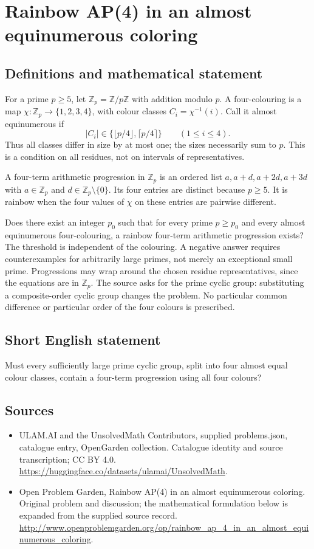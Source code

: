 \documentclass[11pt,a4paper]{article}
\begin{document}
\section*{Rainbow AP(4) in an almost equinumerous coloring}\label{statement}

\subsection{Definitions and mathematical statement}
For a prime $p\ge5$, let $\mathbb Z_p=\mathbb Z/p\mathbb Z$ with addition
modulo $p$. A four-colouring is a map $\chi:\mathbb Z_p\to\{1,2,3,4\}$,
with colour classes $C_i=\chi^{-1}(i)$. Call it almost equinumerous if
\[
 |C_i|\in\{\lfloor p/4\rfloor,\lceil p/4\rceil\}
 \qquad(1\le i\le4).
\]
Thus all classes differ in size by at most one; the sizes necessarily sum
to $p$. This is a condition on all residues, not on intervals of representatives.

A four-term arithmetic progression in $\mathbb Z_p$ is an ordered list
$a,a+d,a+2d,a+3d$ with $a\in\mathbb Z_p$ and
$d\in\mathbb Z_p\setminus\{0\}$. Its four entries are distinct because
$p\ge5$. It is rainbow when the four values of $\chi$ on these entries are
pairwise different.

Does there exist an integer $p_0$ such that for every prime $p\ge p_0$ and
every almost equinumerous four-colouring, a rainbow four-term arithmetic
progression exists? The threshold is independent of the colouring. A
negative answer requires counterexamples for arbitrarily large primes,
not merely an exceptional small prime. Progressions may wrap around the
chosen residue representatives, since the equations are in $\mathbb Z_p$.
The source asks for the prime cyclic group: substituting a composite-order
cyclic group changes the problem. No particular common difference or
particular order of the four colours is prescribed.
\subsection{Short English statement}
Must every sufficiently large prime cyclic group, split into four almost equal colour classes, contain a four-term progression using all four colours?
\subsection{Sources}
\begin{itemize}
\item[S1] ULAM.AI and the UnsolvedMath Contributors, supplied problems.json, catalogue entry, OpenGarden collection. Catalogue identity and source transcription; CC BY 4.0.
\url{https://huggingface.co/datasets/ulamai/UnsolvedMath}.
\item[S2] Open Problem Garden, Rainbow AP(4) in an almost equinumerous coloring. Original problem and discussion; the mathematical formulation below is expanded from the supplied source record.
\url{http://www.openproblemgarden.org/op/rainbow_ap_4_in_an_almost_equinumerous_coloring}.
\end{itemize}
\end{document}
